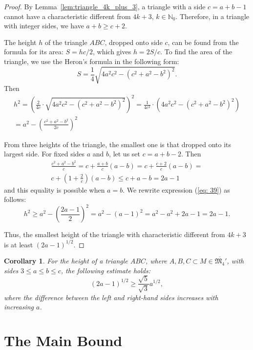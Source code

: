 \documentclass[a4paper,14pt]{article} %
\theoremstyle{plain}
\newtheorem{corollary}[theorem]{Corollary}
\theoremstyle{definition}
\begin{document}
\begin{proof}
	By Lemma~\ref{lem:triangle_4k_plus_3}, a triangle with a side $c=a+b-1$ cannot have a characteristic different from $4k+3$, $k\in \mathbb{N}_0$. Therefore, in a triangle with integer sides, we have $a+b\geq c+2.$

	The height $h$ of the triangle $ABC$, dropped onto side $c$, can be found from the formula for its area: $S=hc/2$, which gives $h=2S/c$. To find the area of the triangle, we use the Heron's formula in the following form:
	$$
	S=\frac{1}{4} \sqrt{4a^2c^2-(c^2+a^2-b^2)^2}.
	$$
	Then
	\begin{multline}
		\label{eq:39}
		h^2=\left( \frac{2}{4c} \cdot \sqrt{4a^2c^2-(c^2+a^2-b^2)^2}\right)^2
		=
		\frac{1}{4c^2} \cdot \left( 4a^2c^2-(c^2+a^2-b^2)^2 \right)
		\\
		=
		a^2- \left(\frac{c^2+a^2-b^2}{2c} \right)^2
	\end{multline}

	From three heights of the triangle, the smallest one is that dropped onto its largest side.
	For fixed sides $a$ and $b$, let us set $c=a+b-2$. Then
	\begin{multline}
		\label{eq: 40}
		\frac{c^2+a^2-b^2}{c}
		=
		c+\frac{a+b}{c}(a-b) = c+\frac{c+2}{c}(a-b)
		=
		\\
		c+\left(1+\frac{2}{c}\right)(a-b) \leq c+a-b=2a-1
	\end{multline}
	and this equality is possible when $a=b$. We rewrite expression (\ref{eq: 39}) as follows:
	$$
	h^2 \geq a^2- \left(\frac{2a-1}{2} \right)^2=a^2-(a-1)^2=a^2-a^2+2a-1=2a-1.
	$$

	Thus, the smallest height of the triangle with characteristic different from $4k+3$ is at least $(2a-1)^{1/2}$.
\end{proof}



\begin{corollary}
	\label{cor:sqrt_5_3}
	For the height of a triangle $ABC$, where ${A, B, C} \subset M \in \overline{\mathfrak{M}_4}'$, with sides $3 \leq a \leq b \leq c$, the following estimate holds:
	$$
		(2a-1)^{1/2} \geq \frac{\sqrt{5}}{\sqrt{3}} a^{1/2},
	$$
	where the difference between the left and right-hand sides increases with increasing $a$.
\end{corollary}

\section{The Main Bound}
\end{document}

